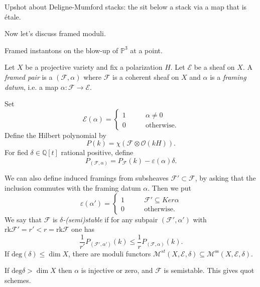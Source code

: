 \documentclass{book}
\begin{document}
\medskip\noindent
Upshot about Deligne-Mumford stacks:
the sit below a stack via a map that is
étale.


















\medskip\noindent
Now let's discuss framed moduli.

\noindent
Framed instantons on the blow-up of
$\mathbb{P}^3$ at a point.

Let $X$ be a projective variety and fix a
polarization $H$.
Let $\mathcal{E}$ be a sheaf on $X$.
A {\it framed pair} is a
$(\mathcal{F},\alpha)$ where
$\mathcal{F}$ is a coherent sheaf on $X$
and $\alpha$ is a {\it framing datum}, i.e.
a map $\alpha:\mathcal{F} \to \mathcal{E}$.

Set
$$
\mathcal{E}(\alpha)
=\begin{cases}
	1\qquad &\alpha\neq 0 \\
	0\qquad &\text{otherwise} .
\end{cases}
$$
Define the Hilbert polynomial by
$$
P(k)=\chi(\mathcal{F} \otimes
\mathcal{O}(kH)).
$$
For fied $\delta \in \mathbb{Q}[t]$ rational
positive,
define
$$
P_{(\mathcal{F},\alpha)}=P_{\mathcal{F}}(k)-
\varepsilon(\alpha)\delta.
$$

We can also define induced framings from
subsheaves $\mathcal{F}' \subset
\mathcal{F}$, by asking that the inclusion
commutes
with the framing datum $\alpha$.
Then we put
$$
\varepsilon(\alpha')
=\begin{cases}
	1\qquad &\mathcal{F}' \subseteq Ker \alpha
	\\
	0\qquad &\text{otherwise} .
\end{cases}
$$
We say that $\mathcal{F}$ is {\it
$\delta$-(semi)stable}
if for any subpair $(\mathcal{F}',\alpha')$
with
$\text{rk}\mathcal{F}'=r'<r=\text{rk}
\mathcal{F}$
one has
$$
\frac{1}{r'}P_{(\mathcal{F}',\alpha')}(k)
\leq  \frac{1}{r}P_{(\mathcal{F},\alpha)}(k).
$$
If $\text{deg}(\delta)\leq \dim X$,
there are moduli functors
$\mathcal{M}^{st}(X,\mathcal{E},\delta)
\subseteq
\mathcal{M}^{\text{ss}}(X,\mathcal{E},\delta)
$.

\begin{remark}
\label{remark-degree-greater-than-dimension}
If $\text{deg} \delta>\dim X$
then $\alpha$ is injective or zero, and
$\mathcal{F}$ is semistable.
This gives quot schemes.
\end{remark}
\end{document}
